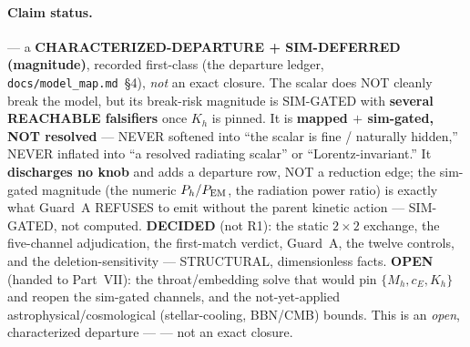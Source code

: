 \paragraph{Claim status.}
\StatusOpen{} --- a \textbf{CHARACTERIZED-DEPARTURE + SIM-DEFERRED (magnitude)},
recorded first-class (the departure ledger, \texttt{docs/model\_map.md}~\S4),
\emph{not} an exact closure. The scalar does NOT cleanly break the model, but its
break-risk magnitude is SIM-GATED with \textbf{several REACHABLE falsifiers} once
\(K_h\) is pinned. It is \textbf{mapped \(+\) sim-gated, NOT resolved} --- NEVER
softened into ``the scalar is fine / naturally hidden,'' NEVER inflated into ``a
resolved radiating scalar'' or ``Lorentz-invariant.'' It \textbf{discharges no
knob} and adds a departure row, NOT a reduction edge; the sim-gated magnitude (the
numeric \(P_h/P_{\rm EM}\), the radiation power ratio) is exactly what Guard~A
REFUSES to emit without the parent kinetic action --- SIM-GATED, not computed.
\textbf{DECIDED} (not R1): the static \(2\times2\) exchange, the five-channel
adjudication, the first-match verdict, Guard~A, the twelve controls, and the
deletion-sensitivity --- STRUCTURAL, dimensionless facts. \textbf{OPEN} (handed to
Part~VII): the throat/embedding solve that would pin \(\{M_h,c_E,K_h\}\) and
reopen the sim-gated channels, and the not-yet-applied astrophysical/cosmological
(stellar-cooling, BBN/CMB) bounds. This is an \emph{open}, characterized departure
--- \StatusOpen{} --- not an exact closure.

